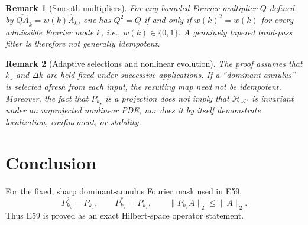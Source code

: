 \documentclass[11pt]{article}
\newtheorem{remark}{Remark}
\newcommand{\calA}{\mathcal{A}^{\star}}
\newcommand{\calH}{\mathcal{H}_{\calA}}
\newcommand{\PA}{P_{k_{\star}}}
\begin{document}
\begin{remark}[Smooth multipliers]
For any bounded Fourier multiplier $Q$ defined by
$\widehat{QA}_k=w(k)\widehat A_k$, one has $Q^{2}=Q$ if and only if
$w(k)^{2}=w(k)$ for every admissible Fourier mode $k$, i.e.,
$w(k)\in\{0,1\}$.  A genuinely tapered band-pass filter is therefore
not generally idempotent.
\end{remark}

\begin{remark}[Adaptive selections and nonlinear evolution]
The proof assumes that $k_{\star}$ and $\Delta k$ are held fixed
under successive applications.  If a ``dominant annulus'' is selected
afresh from each input, the resulting map need not be idempotent.
Moreover, the fact that $\PA$ is a projection does not imply that
$\calH$ is invariant under an unprojected nonlinear PDE, nor does it
by itself demonstrate localization, confinement, or stability.
\end{remark}

\section*{Conclusion}
For the fixed, sharp dominant-annulus Fourier mask used in E59,
\[
\boxed{\PA^{2}=\PA,\qquad\PA^{*}=\PA,\qquad
       \|\PA A\|_{2}\leq\|A\|_{2}.}
\]
Thus E59 is proved as an exact Hilbert-space operator statement.
\end{document}
